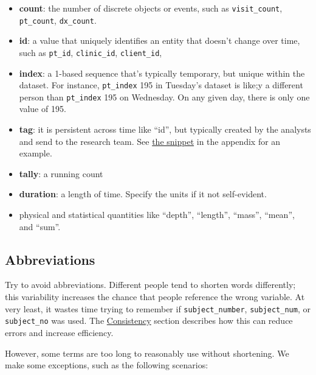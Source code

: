 \documentclass[
]{book}
\providecommand{\tightlist}{%
  \setlength{\itemsep}{0pt}\setlength{\parskip}{0pt}}
\begin{document}
\begin{itemize}
\tightlist
\item
  \textbf{count}: the number of discrete objects or events, such as \texttt{visit\_count}, \texttt{pt\_count}, \texttt{dx\_count}.
\item
  \textbf{id}: a value that uniquely identifies an entity that doesn't change over time, such as \texttt{pt\_id}, \texttt{clinic\_id}, \texttt{client\_id},
\item
  \textbf{index}: a 1-based sequence that's typically temporary, but unique within the dataset. For instance, \texttt{pt\_index} 195 in Tuesday's dataset is like;y a different person than \texttt{pt\_index} 195 on Wednesday. On any given day, there is only one value of 195.
\item
  \textbf{tag}: it is persistent across time like ``id'', but typically created by the analysts and send to the research team. See \protect\hyperlink{snippet-tag}{the snippet} in the appendix for an example.
\item
  \textbf{tally}: a running count
\item
  \textbf{duration}: a length of time. Specify the units if it not self-evident.
\item
  physical and statistical quantities like
  ``depth'',
  ``length'',
  ``mass'',
  ``mean'', and
  ``sum''.
\end{itemize}

\hypertarget{style-abbreviation}{%
\subsection{Abbreviations}\label{style-abbreviation}}

Try to avoid abbreviations. Different people tend to shorten words differently; this variability increases the chance that people reference the wrong variable. At very least, it wastes time trying to remember if \texttt{subject\_number}, \texttt{subject\_num}, or \texttt{subject\_no} was used. The \protect\hyperlink{architecture-consistency}{Consistency} section describes how this can reduce errors and increase efficiency.

However, some terms are too long to reasonably use without shortening. We make some exceptions, such as the following scenarios:
\end{document}

